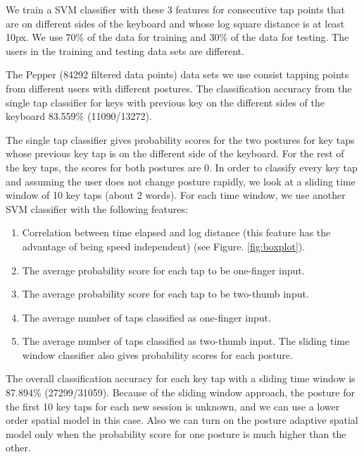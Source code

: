 \documentclass{sigchi}
\begin{document}
We train a SVM classifier with these 3 features for consecutive tap points that 
are on different sides of the keyboard and whose log square distance is at least
10px. We use 70\% of the data for training and 30\% of the
data for testing. The users in the training and testing data sets are different.

The Pepper (84292 filtered data points) data sets we use consist tapping points 
from different users with different postures. The classification accuracy from
the single tap classifier for keys with previous key on the different sides of
the keyboard 83.559\% (11090/13272).

The single tap classifier gives probability scores for the two postures for key taps whose previous key tap is on the different side of the keyboard. For the rest of the key taps, the scores for both postures are 0. In order to classify every key tap and assuming the user does not change posture rapidly, we look at a sliding time window of 10 key taps (about 2 words). For each time window, we use another SVM classifier with the following features:
\begin{enumerate}
\item Correlation between time elapsed and log distance (this feature has the
advantage of being speed independent) (see Figure. \ref{fig:boxplot}).
\item The average probability score for each tap to be one-finger input.
\item The average probability score for each tap to be two-thumb input.
\item The average number of taps classified as one-finger input.
\item The average number of taps classified as two-thumb input.
The sliding time window classifier also gives probability scores for each posture.
\end{enumerate}

The overall classification accuracy for each key tap with a sliding time window
is 87.894\% (27299/31059).
Because of the sliding window approach, the posture for the first 10 key taps for each new session is unknown, and we can use a lower order spatial model in this case. Also we can turn on the posture adaptive spatial model only when the probability score for one posture is much higher than the other.
\end{document}
